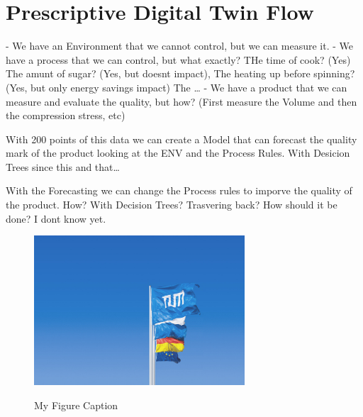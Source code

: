 \section{Prescriptive Digital Twin Flow}

- We have an Environment that we cannot control, but we can measure it.
- We have a process that we can control, but what exactly? THe time of cook? (Yes) The amunt of sugar? (Yes, but doesnt impact), The heating up before spinning? (Yes, but only energy savings impact) The \dots
- We have a product that we can measure and evaluate the quality, but how? (First measure the Volume and then the compression stress, etc) 

With 200 points of this data we can create a Model that can forecast the quality mark of the product looking at the ENV and the Process Rules. With Desicion Trees since this and that\dots

With the Forecasting we can change the Process rules to imporve the quality of the product. How? With Decision Trees? Trasvering back? How should it be done? I dont know yet.




\begin{figure}[h]
    \centering
    \caption{My Figure Caption}
    \includegraphics[width=0.7\textwidth]{tum-resources/images/Universitaet_Flaggen.jpg}
    \label{fig:firstFigure}
\end{figure}
